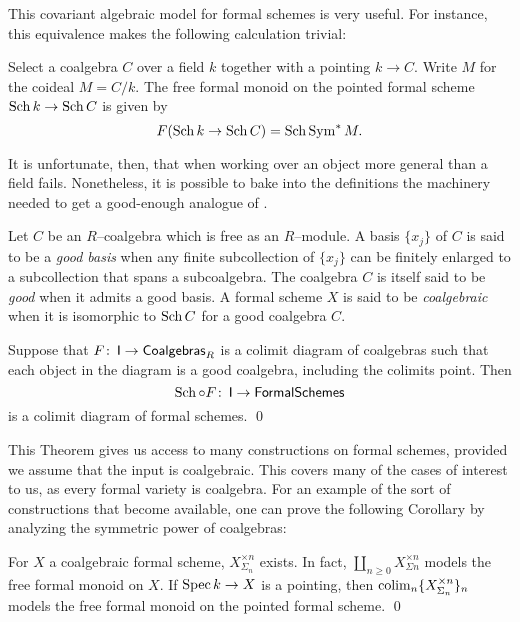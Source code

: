 This covariant algebraic model for formal schemes is very useful.    For instance, this equivalence makes the following calculation trivial:
\begin{lemma}
Select a coalgebra $C$ over a field $k$ together with a pointing $k \to C$.  Write $M$ for the coideal $M = C / k$.  The free formal monoid on the pointed formal scheme $\operatorname{Sch} k \to \operatorname{Sch} C$ is given by  \[F(\Sch k \to \Sch C) = \Sch \Sym^* M. \qed\]
\end{lemma}

It is unfortunate, then, that when working over an object more general than a field  fails.  Nonetheless, it is possible to bake into the definitions the machinery needed to get a good-enough analogue of .

\begin{definition}
Let $C$ be an $R$--coalgebra which is free as an $R$--module.  A basis $\{x_j\}$ of $C$ is said to be a \textit{good basis} when any finite subcollection of $\{x_j\}$ can be finitely enlarged to a subcollection that spans a subcoalgebra.  The coalgebra $C$ is itself said to be \textit{good} when it admits a good basis.  A formal scheme $X$ is said to be \textit{coalgebraic} when it is isomorphic to $\operatorname{Sch} C$ for a good coalgebra $C$.
\end{definition}

\begin{theorem}
Suppose that $F\colon\thinspace \mathsf{I} \to \mathsf{Coalgebras}_R$ is a colimit diagram of coalgebras such that each object in the diagram is a good coalgebra, including the colimits point.  Then \[\operatorname{Sch} \circ F\colon\thinspace \mathsf{I} \to \mathsf{FormalSchemes}\] is a colimit diagram of formal schemes. \qed
\end{theorem}

This Theorem gives us access to many constructions on formal schemes, provided we assume that the input is coalgebraic.  This covers many of the cases of interest to us, as every formal variety is coalgebra.  For an example of the sort of constructions that become available, one can prove the following Corollary by analyzing the symmetric power of coalgebras:

\begin{corollary}
For $X$ a coalgebraic formal scheme, $X^{\times n}_{\Sigma_n}$ exists.  In fact, $\coprod_{n \ge 0} X^{\times n}_{\Sigma n}$ models the free formal monoid on $X$.  If $\operatorname{Spec} k \to X$ is a pointing, then $\operatorname*{colim}_n \{X^{\times n}_{\Sigma_n}\}_n$ models the free formal monoid on the pointed formal scheme. \qed
\end{corollary}

